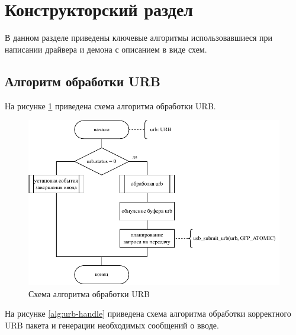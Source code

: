 \section{Конструкторский раздел}

В данном разделе приведены ключевые алгоритмы использовавшиеся при написании драйвера и демона с описанием в виде схем.

\subsection{Алгоритм обработки URB}

На рисунке \ref{alg:urb-dispatch} приведена схема алгоритма обработки URB.

\begin{figure}[ht]
    \centering
    \includegraphics[keepaspectratio,width=\linewidth,height=0.85\textheight]{img/urb-dispatch.pdf}
    \caption{Схема алгоритма обработки URB}
    \label{alg:urb-dispatch}
\end{figure}

На рисунке \ref{alg:urb-handle} приведена схема алгоритма обработки корректного URB пакета и генерации необходимых сообщений о вводе.


